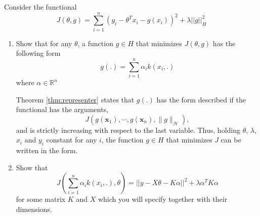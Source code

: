 \documentclass{article}[12pt]
\begin{document}
Consider the functional 
\begin{equation}
J(\theta,g) = \sum_{i=1}^n \left(y_i - \theta^T x_i - g(x_i)\right)^2 + \lambda ||g||_H^2
\end{equation}
\begin{enumerate}
\item 
Show that for any $\theta$, a function $g \in H$ that minimizes $J(\theta,g)$ has the following form 
\begin{equation}
g(.)=\sum_{i=1}^n \alpha_i k(x_i,.)
\end{equation}
where $\alpha \in \mathbb{R}^n$ 

Theorem \ref{thm:representer} states that $g(.)$ has the form described if the functional has the arguments,
\begin{equation}
 J\left(g\left(\mathbf{x}_{1}\right), \cdots, g\left(\mathbf{x}_{n}\right),\|g\|_{\mathcal{H}}\right),
\end{equation}
and is strictly increasing with respect to the last variable. Thus, holding $\theta$, $\lambda$, $x_i$ and $y_i$ constant for any $i$, the function $g \in H$ that minimizes $J$ can be written in the form.
 
\item 
Show that 
\begin{equation}
J(\sum_{i=1}^n \alpha_i k(x_i,.),\theta)=||y - X\theta - K\alpha||^2 + \lambda \alpha^T K \alpha
\end{equation}
for some matrix $K$ and $X$ which you will specify together with their dimensions. 


\end{enumerate}
\end{document}
